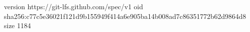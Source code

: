 version https://git-lfs.github.com/spec/v1
oid sha256:c77c5e36021f121d9b155949f414a6e905ba14b008ad7c86351772b62d9864d8
size 1184
